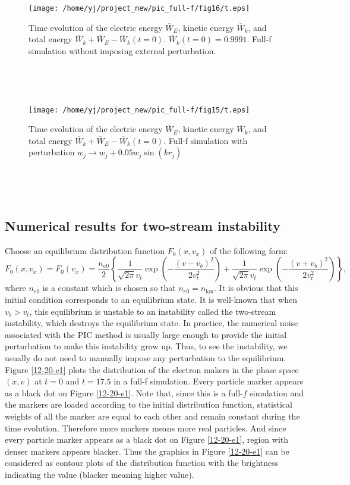 \documentclass{article}
\newcommand{\tmop}[1]{\ensuremath{\operatorname{#1}}}
\begin{document}
\begin{figure}[h]
  \texttt{[image: /home/yj/project\_new/pic\_full-f/fig16/t.eps]}
  \caption{\label{3-10-p1}Time evolution of the electric energy
  $\overline{W}_E$, kinetic energy $\overline{W}_k$, and total energy
  $\overline{W}_k + \overline{W}_E - \overline{W}_k (t = 0)$. $\overline{W}_k
  (t = 0) = 0.9991$. Full-f simulation without imposing external
  perturbation.}
\end{figure}

\

\

\begin{figure}[h]
  \texttt{[image: /home/yj/project\_new/pic\_full-f/fig15/t.eps]}
  \caption{Time evolution of the electric energy $\overline{W}_E$, kinetic
  energy $\overline{W}_k$, and total energy $\overline{W}_k + \overline{W}_E -
  \overline{W}_k (t = 0)$. Full-f simulation with perturbation $w_j
  \longrightarrow w_j + 0.05 w_j \sin (k r_j)$}
\end{figure}

\

\

\subsection{Numerical results for two-stream instability}

Choose an equilibrium distribution function $F_0 (x, v_x)$ of the following
form:
\begin{equation}
  F_0 (x, v_x) = F_0 (v_x) = \frac{n_{e 0}}{2} \left\{ \frac{1}{\sqrt{2 \pi}
  v_t} \exp \left( - \frac{(v - v_b)^2}{2 v_t^2} \right) + \frac{1}{\sqrt{2
  \pi} v_t} \exp \left( - \frac{(v + v_b)^2}{2 v_t^2} \right) \right\},
\end{equation}
where $n_{e 0}$ is a constant which is chosen so that $n_{e 0} =
n_{\tmop{ion}}$. It is obvious that this initial condition corresponds to an
equilibrium state. It is well-known that when $v_b > v_t$, this equilibrium is
unstable to an instability called the two-stream instability, which destroys
the equilibrium state. In practice, the numerical noise associated with the
PIC method is usually large enough to provide the initial perturbation to make
this instability grow up. Thus, to see the instability, we usually do not need
to manually impose any perturbation to the equilibrium. Figure \ref{12-20-e1}
plots the distribution of the electron makers in the phase space $(x, v)$ at
$\overline{t} = 0$ and $\overline{t} = 17.5$ in a full-f simulation. Every
particle marker appears as a black dot on Figure \ref{12-20-e1}. Note that,
since this is a full-$f$ simulation and the markers are loaded according to
the initial distribution function, statistical weights of all the marker are
equal to each other and remain constant during the time evolution. Therefore
more markers means more real particles. And since every particle marker
appears as a black dot on Figure \ref{12-20-e1}, region with denser markers
appears blacker. Thus the graphics in Figure \ref{12-20-e1} can be considered
as contour plots of the distribution function with the brightness indicating
the value (blacker meaning higher value).
\end{document}
